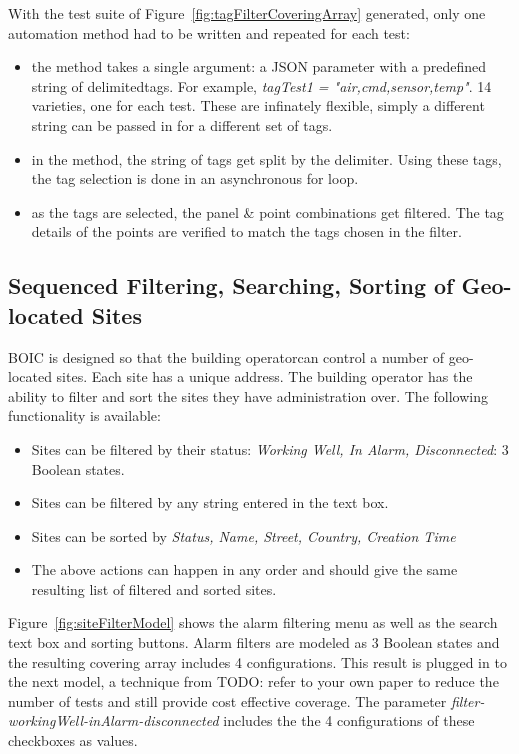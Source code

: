 \documentclass[conference]{IEEEtran}
\newcommand{\todo}[1]{}
\renewcommand{\todo}[1]{{\color{red} TODO: {#1}}}
\begin{document}
	With the test suite of Figure~\ref{fig:tagFilterCoveringArray} generated, only one automation method had to be written and repeated for each test:
	
	\begin{itemize}
		\item the method takes a single argument: a JSON parameter with a predefined string of delimitedtags. For example, \textit{tagTest1 = "air,cmd,sensor,temp"}. 14 varieties, one for each test. These are infinately flexible, simply a different string can be passed in for a different set of tags.
		\item in the method, the string of tags get split by the delimiter. Using these tags, the tag selection is done in an asynchronous for loop. 
		\item as the tags are selected, the panel \& point combinations get filtered. The tag details of the points are verified to match the tags chosen in the filter.
	\end{itemize}

	

	\subsection{Sequenced Filtering, Searching, Sorting of Geo-located Sites}

	BOIC is designed so that the building operatorcan control a number of geo-located sites. 
	Each site has a unique address. The building operator has the ability to filter and sort the sites they have administration over.
	The following functionality is available:
	\begin{itemize}
		\item Sites can be filtered by their status: \textit{Working Well, In Alarm, Disconnected}: 3 Boolean states.
		\item Sites can be filtered by any string entered in the text box.
		\item Sites can be sorted by \textit{Status, Name, Street, Country, Creation Time}
		\item The above actions can happen in any order and should give the same resulting list of filtered and sorted sites.
	\end{itemize}

	Figure~\ref{fig:siteFilterModel} shows the alarm filtering menu as well as the search text box and sorting buttons. 
	Alarm filters are modeled as 3 Boolean states and the resulting covering array includes 4 configurations. 
	This result is plugged in to the next model, a technique from \todo{refer to your own paper} to reduce the number of tests and still provide cost effective coverage.
	The parameter \textit{filter-workingWell-inAlarm-disconnected} includes the the 4 configurations of these checkboxes as values. 
\end{document}
